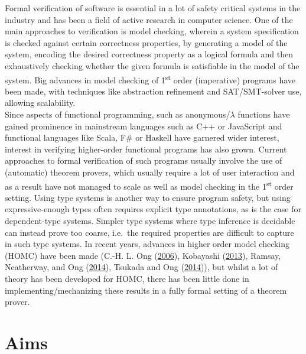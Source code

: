 \documentclass[a4paper, 12pt, twoside]{style/ociamthesis}
\theoremstyle{plain}
\theoremstyle{definition}
\theoremstyle{remark}
\begin{document}
Formal verification of software is essential in a lot of safety critical
systems in the industry and has been a field of active research in
computer science. One of the main approaches to verification is model
checking, wherein a system specification is checked against certain
correctness properties, by generating a model of the system, encoding
the desired correctness property as a logical formula and then
exhaustively checking whether the given formula is satisfiable in the
model of the system. Big advances in model checking of
1\textsuperscript{st} order (imperative) programs have been made, with
techniques like abstraction refinement and SAT/SMT-solver use, allowing
scalability.\\
Since aspects of functional programming, such as anonymous/\(\lambda\)
functions have gained prominence in mainstream languages such as C++ or
JavaScript and functional languages like Scala, F\# or Haskell have
garnered wider interest, interest in verifying higher-order functional
programs has also grown. Current approaches to formal verification of
such programs usually involve the use of (automatic) theorem provers,
which usually require a lot of user interaction and as a result have not
managed to scale as well as model checking in the 1\textsuperscript{st}
order setting. Using type systems is another way to ensure program
safety, but using expressive-enough types often requires explicit type
annotations, as is the case for dependent-type systems. Simpler type
systems where type inference is decidable can instead prove too coarse,
i.e.~the required properties are difficult to capture in such type
systems. In recent years, advances in higher order model checking (HOMC)
have been made (C.-H. L. Ong (\protect\hyperlink{ref-ong06}{2006}),
Kobayashi (\protect\hyperlink{ref-kobayashi13}{2013}), Ramsay,
Neatherway, and Ong (\protect\hyperlink{ref-ramsay14}{2014}), Tsukada
and Ong (\protect\hyperlink{ref-tsukada14}{2014})), but whilst a lot of
theory has been developed for HOMC, there has been little done in
implementing/mechanizing these results in a fully formal setting of a
theorem prover.

\section{Aims}\label{aims}
\end{document}
